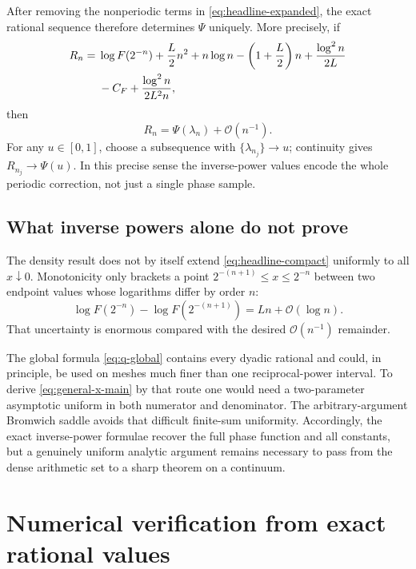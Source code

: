 \documentclass[11pt,oneside]{article}
\theoremstyle{definition}
\theoremstyle{remark}
\newcommand{\bigO}{\mathcal O}
\begin{document}
After removing the nonperiodic terms in \eqref{eq:headline-expanded}, the exact rational
sequence therefore determines $\Psi$ uniquely.  More precisely, if
\begin{align}
 R_n={}&\log F(2^{-n})+\frac L2n^2+n\log n-
 \left(1+\frac L2\right)n+\frac{\log^2n}{2L}               \notag\\
 &-C_F+\frac{\log^2n}{2L^2n},                              \label{eq:renormalized-Rn}
\end{align}
then
\begin{equation}
 R_n=\Psi(\lambda_n)+\bigO(n^{-1}).                         \label{eq:Rn-Psi}
\end{equation}
For any $u\in[0,1]$, choose a subsequence with
$\{\lambda_{n_j}\}\to u$; continuity gives $R_{n_j}\to\Psi(u)$.  In this precise sense the
inverse-power values encode the whole periodic correction, not just a single phase sample.

\subsection{What inverse powers alone do not prove}

The density result does not by itself extend \eqref{eq:headline-compact} uniformly to all
$x\downarrow0$.  Monotonicity only brackets a point
$2^{-(n+1)}\le x\le2^{-n}$ between two endpoint values whose logarithms differ by order $n$:
\begin{equation}
 \log F(2^{-n})-\log F(2^{-(n+1)})=Ln+\bigO(\log n).        \label{eq:dyadic-gap}
\end{equation}
That uncertainty is enormous compared with the desired $\bigO(n^{-1})$ remainder.

The global formula \eqref{eq:q-global} contains every dyadic rational and could, in principle,
be used on meshes much finer than one reciprocal-power interval.  To derive
\eqref{eq:general-x-main} by that route one would need a two-parameter asymptotic uniform in
both numerator and denominator.  The arbitrary-argument Bromwich saddle avoids that difficult
finite-sum uniformity.  Accordingly, the exact inverse-power formulae recover the full phase
function and all constants, but a genuinely uniform analytic argument remains necessary to
pass from the dense arithmetic set to a sharp theorem on a continuum.

\section{Numerical verification from exact rational values}
\label{sec:numerics}
\end{document}
